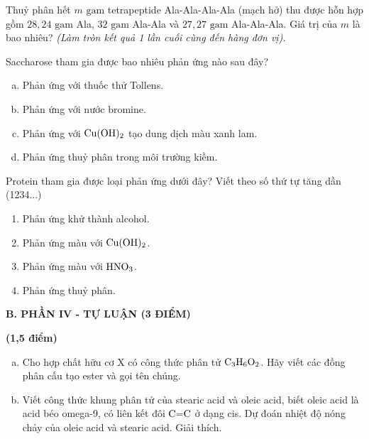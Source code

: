 \documentclass[12pt,a4paper]{article}
\begin{document}
\begin{ex}
Thuỷ phân hết $m\text{ gam}$ tetrapeptide Ala-Ala-Ala-Ala (mạch hở) thu được hỗn hợp gồm $28{,}24\text{ gam}$ Ala, $32\text{ gam}$ Ala-Ala và $27{,}27\text{ gam}$ Ala-Ala-Ala. Giá trị của $m$ là bao nhiêu? \textit{(Làm tròn kết quả 1 lần cuối cùng đến hàng đơn vị)}.
\loigiai{}
\end{ex}

\begin{ex}
Saccharose tham gia được bao nhiêu phản ứng nào sau đây?
\begin{enumerate}[(a)]
	\item Phản ứng với thuốc thử Tollens.
	\item Phản ứng với nước bromine.
	\item Phản ứng với $\ce{Cu(OH)2}$ tạo dung dịch màu xanh lam.
	\item Phản ứng thuỷ phân trong môi trường kiềm.
\end{enumerate}
\loigiai{}
\end{ex}

\begin{ex}
Protein tham gia được loại phản ứng dưới đây? Viết theo số thứ tự tăng dần (1234...)
\begin{enumerate}[(1)]
	\item Phản ứng khử thành alcohol.
	\item Phản ứng màu với $\ce{Cu(OH)2}$.
	\item Phản ứng màu với $\ce{HNO3}$.
	\item Phản ứng thuỷ phân.
\end{enumerate}
\loigiai{}
\end{ex}

\vspace{0.4cm}
\noindent
\textbf{B. PHẦN IV - TỰ LUẬN (3 ĐIỂM)}

\setcounter{ex}{0}

\begin{ex}
\textbf{(1,5 điểm)}
\begin{enumerate}[a)]
	\item Cho hợp chất hữu cơ X có công thức phân tử $\ce{C3H6O2}$. Hãy viết các đồng phân cấu tạo ester và gọi tên chúng.
	\item Viết công thức khung phân tử của stearic acid và oleic acid, biết oleic acid là acid béo omega-9, có liên kết đôi $\ce{C=C}$ ở dạng cis. Dự đoán nhiệt độ nóng chảy của oleic acid và stearic acid. Giải thích.
\end{enumerate}
\loigiai{}
\end{ex}
\end{document}
